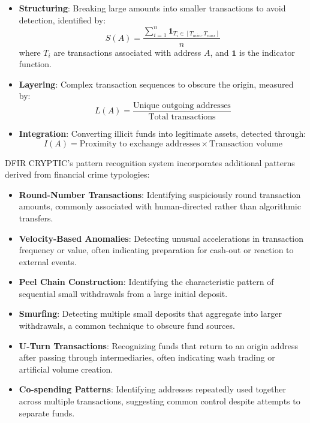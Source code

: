 \documentclass[conference]{IEEEtran}
\begin{document}
\begin{itemize}
    \item \textbf{Structuring}: Breaking large amounts into smaller transactions to avoid detection, identified by:
    \begin{equation}
    S(A) = \frac{\sum_{i=1}^{n} \mathbf{1}_{T_i \in [T_{min}, T_{max}]}}{n}
    \end{equation}
    where $T_i$ are transactions associated with address $A$, and $\mathbf{1}$ is the indicator function.
    
    \item \textbf{Layering}: Complex transaction sequences to obscure the origin, measured by:
    \begin{equation}
    L(A) = \frac{\text{Unique outgoing addresses}}{\text{Total transactions}}
    \end{equation}
    
    \item \textbf{Integration}: Converting illicit funds into legitimate assets, detected through:
    \begin{equation}
    I(A) = \text{Proximity to exchange addresses} \times \text{Transaction volume}
    \end{equation}
\end{itemize}

DFIR CRYPTIC's pattern recognition system incorporates additional patterns derived from financial crime typologies:

\begin{itemize}
    \item \textbf{Round-Number Transactions}: Identifying suspiciously round transaction amounts, commonly associated with human-directed rather than algorithmic transfers.
    
    \item \textbf{Velocity-Based Anomalies}: Detecting unusual accelerations in transaction frequency or value, often indicating preparation for cash-out or reaction to external events.
    
    \item \textbf{Peel Chain Construction}: Identifying the characteristic pattern of sequential small withdrawals from a large initial deposit.
    
    \item \textbf{Smurfing}: Detecting multiple small deposits that aggregate into larger withdrawals, a common technique to obscure fund sources.
    
    \item \textbf{U-Turn Transactions}: Recognizing funds that return to an origin address after passing through intermediaries, often indicating wash trading or artificial volume creation.
    
    \item \textbf{Co-spending Patterns}: Identifying addresses repeatedly used together across multiple transactions, suggesting common control despite attempts to separate funds.
\end{itemize}
\end{document}
